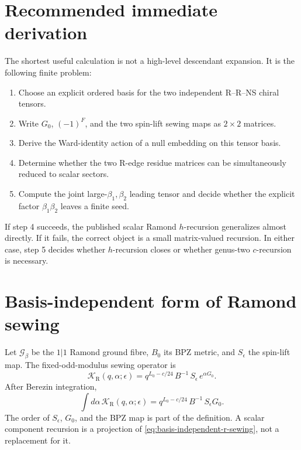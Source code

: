 \documentclass[11pt]{article}
\newcommand{\R}{\mathrm{R}}
\begin{document}
\section{Recommended immediate derivation}

The shortest useful calculation is not a high-level descendant expansion.
It is the following finite problem:
\begin{enumerate}
 \item Choose an explicit ordered basis for the two independent R--R--NS
 chiral tensors.
 \item Write \(G_0\), \((-1)^F\), and the two spin-lift sewing maps as
 \(2\times2\) matrices.
 \item Derive the Ward-identity action of a null embedding on this tensor
 basis.
 \item Determine whether the two R-edge residue matrices can be
 simultaneously reduced to scalar sectors.
 \item Compute the joint large-\(\beta_1,\beta_2\) leading tensor and decide
 whether the explicit factor \(\beta_1\beta_2\) leaves a finite seed.
\end{enumerate}
If step 4 succeeds, the published scalar Ramond \(h\)-recursion generalizes
almost directly.  If it fails, the correct object is a small matrix-valued
recursion.  In either case, step 5 decides whether \(h\)-recursion closes or
whether genus-two \(c\)-recursion is necessary.

\appendix

\section{Basis-independent form of Ramond sewing}

Let \(\mathcal G_\beta\) be the \(1|1\) Ramond ground fibre, \(B_0\) its BPZ
metric, and \(S_\epsilon\) the spin-lift map.  The fixed-odd-modulus sewing
operator is
\begin{equation}
 \mathcal K_\R(q,\alpha;\epsilon)
 =
 q^{L_0-c/24}\,
 B^{-1}\,
 S_\epsilon\,
 e^{\alpha G_0}.
 \label{eq:basis-independent-r-sewing}
\end{equation}
After Berezin integration,
\begin{equation}
 \int d\alpha\,
 \mathcal K_\R(q,\alpha;\epsilon)
 =
 q^{L_0-c/24}\,
 B^{-1}\,
 S_\epsilon G_0.
 \label{eq:integrated-r-sewing}
\end{equation}
The order of \(S_\epsilon\), \(G_0\), and the BPZ map is part of the
definition.  A scalar component recursion is a projection of
\eqref{eq:basis-independent-r-sewing}, not a replacement for it.
\end{document}
